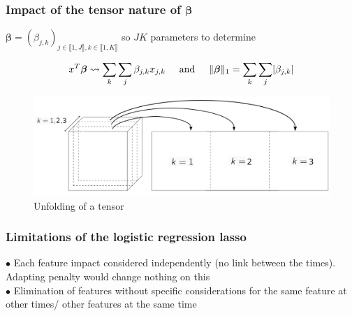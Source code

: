 \documentclass{beamer}
\begin{document}
\begin{frame}
    \frametitle{Impact of the tensor nature of $\bm{\beta}$}
    \begin{center}
    $\bm{\beta} = (\beta_{j,k})_{j \in \llbracket 1, J\rrbracket, k \in \llbracket 1, K\rrbracket}$ so $JK$ parameters to determine\\[15 pt]
    \end{center}
    $$x^T \bm{\beta} \leadsto \sum\limits_{k}\sum\limits_{j}  \beta_{j,k} x_{j,k} \hspace{0.5 cm} \text{and} \hspace{0.5 cm} \lVert \bm{\beta} \rVert_1 = \sum\limits_{k}\sum\limits_{j} \lvert \beta_{j,k} \rvert$$
    \begin{figure}
        \centering
        \includegraphics[scale = 0.2]{images/deplier.png}
        \caption{Unfolding of a tensor}
    \end{figure}

    
\end{frame}

\begin{frame}
    \frametitle{Limitations of the logistic regression lasso}
        $\bullet$ Each feature impact considered independently (no link between the times). Adapting penalty would change nothing on this\\[15 pt]
        $\bullet$ Elimination of features without specific considerations for the same feature at other times/ other features at the same time\\[15 pt]

\end{frame}
\end{document}
